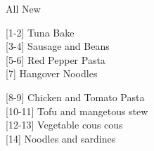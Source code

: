 		\begin{menu}{All New}
    
    \begin{recipelist}
    
        {\scriptsize[1-2]} Tuna Bake\\
        {\scriptsize[3-4]} Sausage and Beans\\
        {\scriptsize[5-6]} Red Pepper Pasta\\
        {\scriptsize[7]} Hangover Noodles\\%
    \end{recipelist}%
    \begin{recipelist}
    
        {\scriptsize[8-9]} Chicken and Tomato Pasta\\
        {\scriptsize[10-11]} Tofu and mangetous stew\\
        {\scriptsize[12-13]} Vegetable cous cous\\
        {\scriptsize[14]} Noodles and sardines\\%
    \end{recipelist}\par%
  

\end{menu}
